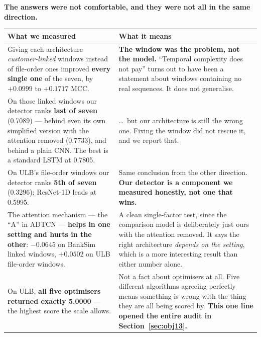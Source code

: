 \documentclass[11pt]{article}
\begin{document}
\textbf{The answers were not comfortable, and they were not all in the same direction.}

\begin{center}\small
\begin{tabularx}{\linewidth}{@{}p{4.6cm} X@{}}
\toprule
\textbf{What we measured} & \textbf{What it means} \\
\midrule
Giving each architecture \emph{customer-linked} windows instead of file-order ones improved \textbf{every single one} of the seven, by $+0.0999$ to $+0.1717$ MCC. & \textbf{The window was the problem, not the model.} ``Temporal complexity does not pay'' turns out to have been a statement about windows containing no real sequences. It does not generalise. \\
On those linked windows our detector ranks \textbf{last of seven} (0.7089) --- behind even its own simplified version with the attention removed (0.7733), and behind a plain CNN. The best is a standard LSTM at 0.7805. & \dots\ but our architecture is still the wrong one. Fixing the window did not rescue it, and we report that. \\
On ULB's file-order windows our detector ranks \textbf{5th of seven} (0.3296); ResNet-1D leads at 0.5995. & Same conclusion from the other direction. \textbf{Our detector is a component we measured honestly, not one that wins.} \\
The attention mechanism --- the ``A'' in ADTCN --- \textbf{helps in one setting and hurts in the other}: $-0.0645$ on BankSim linked windows, $+0.0502$ on ULB file-order windows. & A clean single-factor test, since the comparison model is deliberately just ours with the attention removed. It says the right architecture \emph{depends on the setting}, which is a more interesting result than either number alone. \\
On ULB, \textbf{all five optimisers returned exactly 5.0000} --- the highest score the scale allows. & Not a fact about optimisers at all. Five different algorithms agreeing perfectly means something is wrong with the thing they are all being scored by. \textbf{This one line opened the entire audit in Section~\ref{sec:obj13}.} \\
\bottomrule
\end{tabularx}
\end{center}
\end{document}

